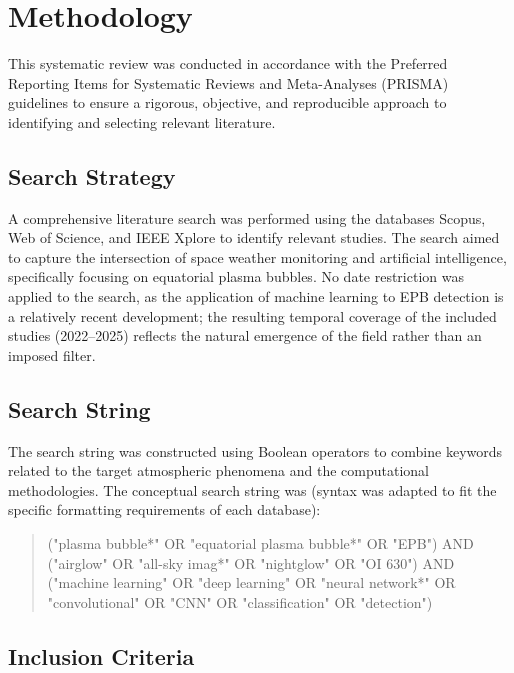 \section{Methodology}\label{sec:methodology}

This systematic review was conducted in accordance with the Preferred Reporting Items for Systematic Reviews and Meta-Analyses (PRISMA) guidelines to ensure a rigorous, objective, and reproducible approach to identifying and selecting relevant literature.

\subsection{Search Strategy}\label{subsec:search-strategy}

A comprehensive literature search was performed using the databases Scopus, Web of Science, and IEEE Xplore to identify relevant studies. The search aimed to capture the intersection of space weather monitoring and artificial intelligence, specifically focusing on equatorial plasma bubbles. No date restriction was applied to the search, as the application of machine learning to EPB detection is a relatively recent development; the resulting temporal coverage of the included studies (2022--2025) reflects the natural emergence of the field rather than an imposed filter.

\subsection{Search String}\label{subsec:search-string}

The search string was constructed using Boolean operators to combine keywords related to the target atmospheric phenomena and the computational methodologies. The conceptual search string was (syntax was adapted to fit the specific formatting requirements of each database):

\begin{quote}
\small
\ttfamily
("plasma bubble*" OR "equatorial plasma bubble*" OR "EPB")
AND
("airglow" OR "all-sky imag*" OR "nightglow" OR "OI 630")
AND
("machine learning" OR "deep learning" OR "neural network*" OR "convolutional" OR "CNN" OR "classification" OR "detection")
\end{quote}

\subsection{Inclusion Criteria}\label{subsec:inclusion-criteria}

